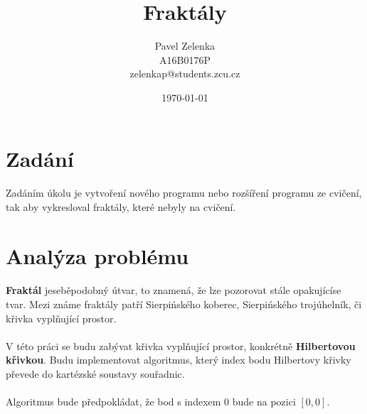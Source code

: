 \documentclass[12pt]{scrartcl}
\author{Pavel Zelenka\\A16B0176P\\zelenkap@students.zcu.cz}
\date{\today}
\title{Fraktály}
\begin{document}
\maketitle
{}
\newpage
{}
\newpage
\section{Zadání}
	
\paragraph{}
Zadáním úkolu je vytvoření nového programu nebo rozšíření programu ze cvičení, tak aby vykresloval fraktály, které nebyly na cvičení.

\section{Analýza problému}

\paragraph{}
\textbf{Fraktál} je\nobreakspace seběpodobný útvar, to znamená, že lze pozorovat stále opakující\nobreakspace se tvar. Mezi známe fraktály patří Sierpińského koberec, Sierpińského trojúhelník, či křivka vyplňující prostor.

\paragraph{}
V této práci se budu zabývat křivka vyplňující prostor, konkrétně \textbf{Hilbertovou křivkou}. Budu implementovat algoritmus, který index bodu Hilbertovy křivky převede do kartézské soustavy souřadnic.

\paragraph{}
Algoritmus bude předpokládat, že bod s indexem $0$ bude na pozici $[0,0]$. 
\end{document}
